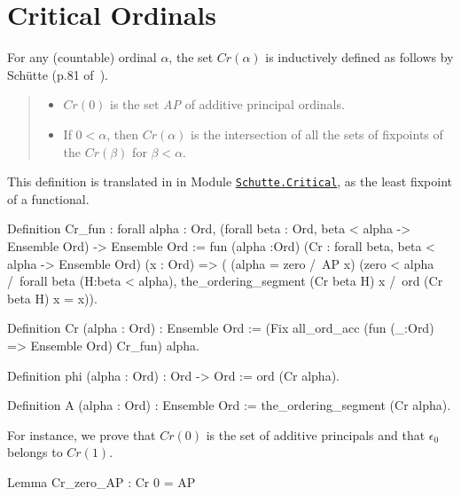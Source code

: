 {\section{Critical Ordinals}


For any  (countable) ordinal $\alpha$, the set $\textit{Cr}(\alpha)$ is inductively defined 
as follows by Schütte (p.81 of~\cite{schutte}).

\begin{quote}
  \begin{itemize}
  \item $\textit{Cr}(0)$ is the set \textit{AP} of additive principal ordinals.
  \item If $0<\alpha$, then $\textit{Cr}(\alpha)$ is the intersection of all the sets of fixpoints of the $\textit{Cr}(\beta)$ for $\beta<\alpha$.
  \end{itemize}
\end{quote}

This definition is translated in \coq{} in 
Module \href{../theories/html/hydras.Schutte.Critical.html}%
{\texttt{Schutte.Critical}}, as the least fixpoint of a functional. 


\begin{Coqsrc}
Definition Cr_fun : forall alpha : Ord,
       (forall beta : Ord, beta < alpha -> Ensemble Ord) ->
        Ensemble Ord 
:= 
   fun (alpha :Ord)
        (Cr : forall beta, 
                beta < alpha -> Ensemble Ord) 
        (x : Ord) => (
       (alpha = zero /\ AP x) \/
       (zero < alpha /\
        forall beta (H:beta < alpha),
          the_ordering_segment (Cr beta H) x /\ ord (Cr  beta H) x = x)).

Definition Cr (alpha : Ord) : Ensemble Ord := 
    (Fix  all_ord_acc (fun (_:Ord) => Ensemble Ord) Cr_fun) alpha.
\end{Coqsrc}

\label{sect:phi-schutte}

\begin{Coqsrc}
Definition phi (alpha : Ord) : Ord -> Ord 
    :=  ord (Cr alpha).

Definition A (alpha : Ord) : Ensemble Ord :=
  the_ordering_segment (Cr alpha).
\end{Coqsrc}

For instance,  we prove that $\textit{Cr}(0)$ is the set of additive principals and that $\epsilon_0$
belongs to $\textit{Cr}(1)$.

\begin{Coqsrc}
Lemma Cr_zero_AP :  Cr 0 = AP


\end{Coqsrc}}
